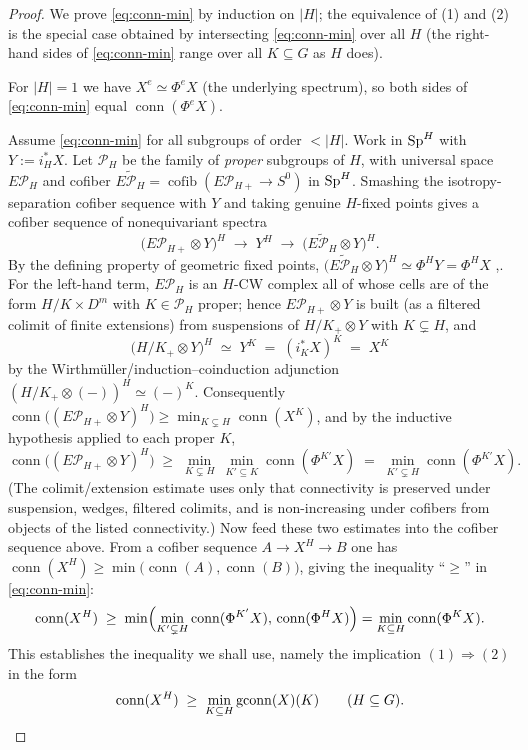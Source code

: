 \begin{proof}
We prove \eqref{eq:conn-min} by induction on $|H|$; the equivalence of (1) and
(2) is the special case obtained by intersecting \eqref{eq:conn-min} over all
$H$ (the right-hand sides of \eqref{eq:conn-min} range over all $K\subseteq G$
as $H$ does).

For $|H|=1$ we have $X^{e}\simeq\Phi^{e}X$ (the underlying spectrum), so both
sides of \eqref{eq:conn-min} equal $\operatorname{conn}(\Phi^{e}X)$.

Assume \eqref{eq:conn-min} for all subgroups of order $<|H|$. Work in $\mathrm{Sp}^H$
with $Y:=i_H^\ast X$. Let $\mathcal P_H$ be the family of \emph{proper}
subgroups of $H$, with universal space $E\mathcal P_{H}$ and cofiber
$\widetilde{E\mathcal P_H}=\operatorname{cofib}(E\mathcal P_{H+}\to S^0)$ in
$\mathrm{Sp}^H$. Smashing the isotropy-separation cofiber sequence with $Y$ and
taking genuine $H$-fixed points gives a cofiber sequence of nonequivariant
spectra
\[
\bigl(E\mathcal P_{H+}\otimes Y\bigr)^H\;\longrightarrow\;Y^H\;\longrightarrow\;
\bigl(\widetilde{E\mathcal P_H}\otimes Y\bigr)^H .
\]
By the defining property of geometric fixed points,
$\bigl(\widetilde{E\mathcal P_H}\otimes Y\bigr)^H\simeq\Phi^H Y=\Phi^H X$
\cite[\S2.5.2]{HHR16},\cite[\S6]{HillPrimer}. For the left-hand term,
$E\mathcal P_H$ is an $H$-CW complex all of whose cells are of the form
$H/K\times D^m$ with $K\in\mathcal P_H$ proper; hence $E\mathcal P_{H+}\otimes Y$
is built (as a filtered colimit of finite extensions) from suspensions of
$H/K_+\otimes Y$ with $K\subsetneq H$, and
\[
\bigl(H/K_+\otimes Y\bigr)^H\;\simeq\;Y^K\;=\;(i_K^\ast X)^K\;=\;X^K
\]
by the Wirthm\"uller/induction--coinduction adjunction
$(H/K_+\otimes(-))^H\simeq(-)^K$. Consequently
$\operatorname{conn}\bigl((E\mathcal P_{H+}\otimes Y)^H\bigr)\ge
\min_{K\subsetneq H}\operatorname{conn}(X^K)$, and by the inductive hypothesis
applied to each proper $K$,
\[
\operatorname{conn}\bigl((E\mathcal P_{H+}\otimes Y)^H\bigr)\;\ge\;
\min_{K\subsetneq H}\ \min_{K'\subseteq K}\operatorname{conn}(\Phi^{K'}X)
\;=\;\min_{K'\subsetneq H}\operatorname{conn}(\Phi^{K'}X).
\]
(The colimit/extension estimate uses only that connectivity is preserved under
suspension, wedges, filtered colimits, and is non-increasing under cofibers from
objects of the listed connectivity.) Now feed these two estimates into the
cofiber sequence above. From a cofiber sequence $A\to X^H\to B$ one has
$\operatorname{conn}(X^H)\ge\min\bigl(\operatorname{conn}(A),\operatorname{conn}(B)\bigr)$,
giving the inequality ``$\ge$'' in \eqref{eq:conn-min}:
\[
\operatorname{conn}(X^H)\;\ge\;
\min\Bigl(\min_{K'\subsetneq H}\operatorname{conn}(\Phi^{K'}X),\,\operatorname{conn}(\Phi^H X)\Bigr)
=\min_{K\subseteq H}\operatorname{conn}(\Phi^K X).
\]
This establishes the inequality we shall use, namely the implication
$(1)\Rightarrow(2)$ in the form
\begin{equation}\label{eq:conn-ge}
\operatorname{conn}(X^H)\;\ge\;\min_{K\subseteq H}\operatorname{gconn}(X)(K)\qquad(H\subseteq G).
\end{equation}


\end{proof}
